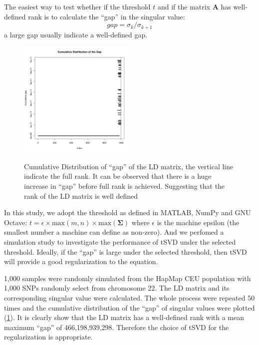 			The easiest way to test whether if the threshold $t$ and if the matrix $\boldsymbol{A}$ has well-defined rank is to calculate the ``gap'' in the singular value:
			\begin{equation}
			gap = \sigma_k/\sigma_{k+1}
			\label{eq:gapSingular}
			\end{equation}
			a large gap usually indicate a well-defined gap. 
			\begin{figure}
				\caption[Cumulative Distribution of ``gap'' of the LD matrix]{Cumulative Distribution of ``gap'' of the LD matrix, the vertical line indicate the full rank. It can be observed that there is a huge increase in ``gap'' before full rank is achieved. Suggesting that the rank of the LD matrix is well defined}
				\centering
				\includegraphics[width=0.5\textwidth]{figure/singular_value_distribution.png}
				\label{fig:singularValueDist}
				\vspace{-20pt}
			\end{figure}
			In this study, we adopt the threshold as defined in MATLAB, NumPy and GNU Octave: $t=\epsilon\times\mathrm{max}(m,n)\times\mathrm{max}(\boldsymbol{\Sigma})$ where $\epsilon$ is the machine epsilon (the smallest number a machine can define as non-zero). 
			And we perfomed a simulation study to investigate the performance of \gls{tSVD} under the selected threshold.
			Ideally, if the ``gap'' is large under the selected threshold, then \gls{tSVD} will provide a good regularization to the equation. 
			
			1,000 samples were randomly simulated from the HapMap \citep{Altshuler2010} \gls{CEU} population with
			1,000 \glspl{SNP} randomly select from chromosome 22. 
			The \gls{LD} matrix and its corresponding singular value were calculated. 
			The whole process were repeated 50 times and the cumulative distribution of the ``gap'' of singular values were plotted (\cref{fig:singularValueDist}). 
			It is clearly show that the \gls{LD} matrix has a well-defined rank with a mean maximum ``gap'' of 466,198,939,298.
			Therefore the choice of \gls{tSVD} for the regularization is appropriate.
			
